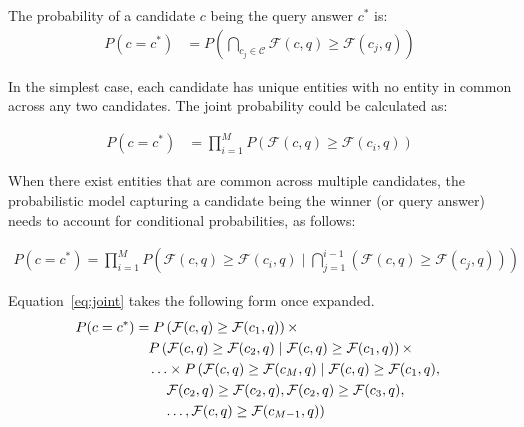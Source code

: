  The probability of a candidate $c$ being the query answer $c^*$ is:
 \begin{align}\label{eq:prob}
    P(c = c^*) &= P\left(\bigcap_{c_j \in \mathcal{C}} \mathcal{F}(c, q) \geq \mathcal{F}(c_j, q)\right)
\end{align}


In the simplest case, each candidate has unique entities with no entity in common across any two candidates. The joint probability could be calculated as:

\begin{align}\label{eq:ind}
P(c = c^*) &= \prod_{i=1}^{M} P\left(\mathcal{F}(c, q) \geq \mathcal{F}(c_i, q)\right)
\end{align}

When there exist entities that are common across multiple candidates, the probabilistic model capturing a candidate being the winner (or query answer) needs to account for conditional probabilities, as follows:


\begin{align}\label{eq:joint}
P(c = c^*) = \prod_{i=1}^{M} P\left(\mathcal{F}(c, q) \geq \mathcal{F}(c_i, q) \mid \bigcap_{j=1}^{i-1} \left( \mathcal{F}(c, q) \geq \mathcal{F}(c_j, q) \right) \right)
\end{align}

Equation~\ref{eq:joint} takes the following form once expanded.
\begin{align}\label{eq:jointexpand}
P(c = c^*) &= P\left(\mathcal{F}(c, q) \geq \mathcal{F}(c_1, q)\right) \times \notag \\
& \quad P\left(\mathcal{F}(c, q) \geq \mathcal{F}(c_2, q)  \mid \mathcal{F}(c, q) \geq \mathcal{F}(c_1, q) \right) \times \notag \\
& \quad \ldots \times P\left( \mathcal{F}(c, q) \geq \mathcal{F}(c_M, q) \mid \mathcal{F}(c, q) \geq \mathcal{F}(c_1, q), \right. \notag \\
& \quad \quad \left. \mathcal{F}(c_2, q) \geq \mathcal{F}(c_2, q), \mathcal{F}(c_2, q) \geq \mathcal{F}(c_3, q), \right. \notag \\
& \quad \quad \left. \ldots, \mathcal{F}(c, q) \geq \mathcal{F}(c_{M-1}, q)\right)
\end{align}





